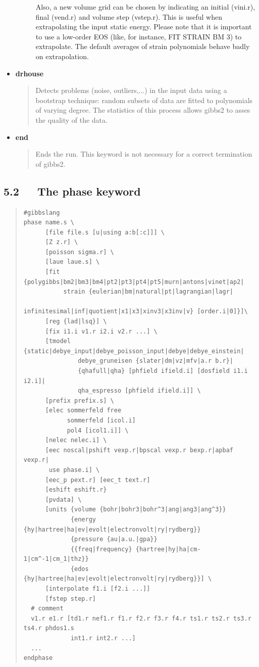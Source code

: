\documentclass[a4paper]{article}
\begin{document}
\begin{itemize}
\begin{description}
Also, a new volume grid can be chosen by indicating an initial
(vini.r), final (vend.r) and volume step (vstep.r). This is useful
when extrapolating the input static energy. Please note that it is
important to use a low-order EOS (like, for instance, FIT STRAIN BM
3) to extrapolate. The default averages of strain polynomials
behave badly on extrapolation.

\end{description}

\item \textbf{drhouse}

\begin{quote}
Detects problems (noise, outliers,...) in the input data using a
bootstrap technique: random subsets of data are fitted to
polynomials of varying degree. The statistics of this process
allows gibbs2 to asses the quality of the data.
\end{quote}

\item \textbf{end}

\begin{quote}
Ends the run. This keyword is not necessary for a correct
termination of gibbs2.
\end{quote}
\end{itemize}


\subsection{5.2   The phase keyword%
  \label{the-phase-keyword}%
}

\begin{quote}
\begin{verbatim}
#gibbslang
phase name.s \
      [file file.s [u|using a:b[:c]]] \
      [Z z.r] \
      [poisson sigma.r] \
      [laue laue.s] \
      [fit {polygibbs|bm2|bm3|bm4|pt2|pt3|pt4|pt5|murn|antons|vinet|ap2|
           strain {eulerian|bm|natural|pt|lagrangian|lagr|
                   infinitesimal|inf|quotient|x1|x3|xinv3|x3inv|v} [order.i|0]}]\
      [reg {lad|lsq}] \
      [fix i1.i v1.r i2.i v2.r ...] \
      [tmodel {static|debye_input|debye_poisson_input|debye|debye_einstein|
               debye_gruneisen {slater|dm|vz|mfv|a.r b.r}|
               {qhafull|qha} [phfield ifield.i] [dosfield i1.i i2.i]|
               qha_espresso [phfield ifield.i]] \
      [prefix prefix.s] \
      [elec sommerfeld free
            sommerfeld [icol.i]
            pol4 [icol1.i]] \
      [nelec nelec.i] \
      [eec noscal|pshift vexp.r|bpscal vexp.r bexp.r|apbaf vexp.r|
       use phase.i] \
      [eec_p pext.r] [eec_t text.r]
      [eshift eshift.r}
      [pvdata] \
      [units {volume {bohr|bohr3|bohr^3|ang|ang3|ang^3}}
             {energy {hy|hartree|ha|ev|evolt|electronvolt|ry|rydberg}}
             {pressure {au|a.u.|gpa}}
             {{freq|frequency} {hartree|hy|ha|cm-1|cm^-1|cm_1|thz}}
             {edos {hy|hartree|ha|ev|evolt|electronvolt|ry|rydberg}}] \
      [interpolate f1.i [f2.i ...]]
      [fstep step.r]
  # comment
  v1.r e1.r [td1.r nef1.r f1.r f2.r f3.r f4.r ts1.r ts2.r ts3.r ts4.r phdos1.s
             int1.r int2.r ...]
  ...
endphase
\end{verbatim}
\end{quote}
\end{document}
